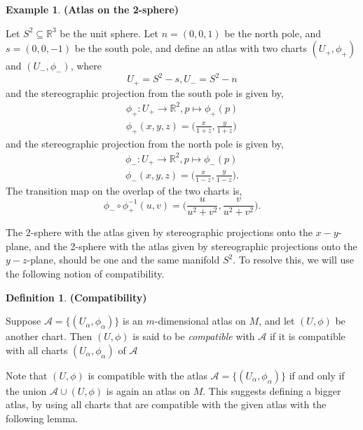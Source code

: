 \documentclass{article}
\theoremstyle{definition}
\newtheorem{defn}[theorem]{Definition}
\newtheorem{example}[theorem]{Example}
\newenvironment{definition}
  {\vspace{8pt}\begin{mdframed}[backgroundcolor=blueish]\begin{defn}}
  {\end{defn}\end{mdframed}\vspace{4pt}}
\begin{document}
\begin{example} \textbf{(Atlas on the 2-sphere)}

Let $S^2 \subseteq \mathbb R^3$ be the unit sphere. Let $n = (0,0,1)$ be the north pole, and $s =(0,0,-1)$ be the south pole, and define an atlas with two charts $(U_+,\phi_+)$ and $(U_-,\phi_-)$, where
\[
U_+ = S^2 - {s}, U_- = S^2 - {n}
\]
and the stereographic projection from the south pole is given by,
\begin{align*}
    \phi_+ : U_+ \rightarrow \mathbb R^2, p \mapsto \phi_+(p)\\
    \phi_+(x, y,z) = \bigg( \frac{x}{1+z},\frac{y}{1+z} \bigg)
\end{align*}
and the stereographic projection from the north pole is given by,
\begin{align*}
    \phi_- : U_+ \rightarrow \mathbb R^2, p \mapsto \phi_-(p)\\
    \phi_-(x, y,z) = \bigg( \frac{x}{1-z},\frac{y}{1-z} \bigg).
\end{align*}
The transition map on the overlap of the two charts is,
\begin{equation*}
    \phi_- \circ \phi_+^{-1} (u,v) =  \bigg( \frac{u}{u^2 + v^2}, \frac{v}{u^2 + v^2} \bigg).
\end{equation*}

\end{example}



The 2-sphere with the atlas given by stereographic projections onto the $x-y$-plane, and the 2-sphere with the atlas given by stereographic projections onto the $y-z$-plane, should be one and the same manifold $S^2$. To resolve this, we will use the following notion of compatibility.

\begin{definition} \textbf{(Compatibility)}

Suppose $\mathscr{A} =  \{(U_\alpha, \phi_\alpha) \}$ is an $m$-dimensional atlas on $M$, and let $(U,\phi)$ be another chart. Then $(U,\phi)$ is said to be \textit{compatible} with $\mathscr{A}$ if it is compatible with all charts $(U_\alpha, \phi_\alpha)$ of $\mathscr{A}$
\end{definition}

Note that  $(U,\phi)$ is compatible with the atlas $\mathscr{A} =  \{(U_\alpha, \phi_\alpha) \}$ if and only if the union $\mathscr{A} \cup {(U,\phi)}$ is again an atlas on $M$. This suggests defining a bigger atlas, by using all charts that are compatible with the given atlas with the following lemma.
\end{document}

